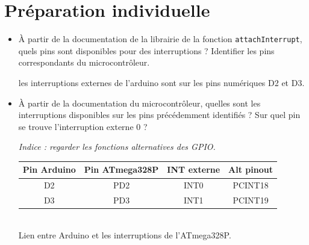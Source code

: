 \documentclass[a4paper,11pt]{article}
\begin{document}
\section{Préparation individuelle}

\begin{itemize}
    \item À partir de la documentation de la librairie de la fonction \texttt{attachInterrupt}, quels pins sont disponibles pour des interruptions ? Identifier les pins correspondants du microcontrôleur.
    \begin{solution}
    les interruptions externes de l'arduino sont sur les pins numériques D2 et D3.
    
    \end{solution}

    \item À partir de la documentation du microcontrôleur, quelles sont les interruptions disponibles sur les pins précédemment identifiés ? Sur quel pin se trouve l'interruption externe 0 ?

    
    \textit{Indice : regarder les fonctions alternatives des GPIO.}
    \begin{solution}
    
    \centering 
    \begin{tabular}{|c|c|c|c|} \hline 
    \textbf{Pin Arduino} & \textbf{Pin ATmega328P} & \textbf{INT externe} & \textbf{Alt pinout} \\ \hline 
    D2 & PD2 & INT0 & PCINT18 \\ \hline 
    D3 & PD3 & INT1 & PCINT19 \\ \hline 
    \end{tabular} \\ 
    Lien entre Arduino et les interruptions de l'ATmega328P.
    
    \end{solution}


\end{itemize}
\end{document}
